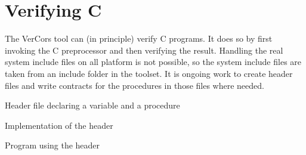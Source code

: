 \chapter{Verifying C}


The VerCors tool can (in principle) verify C programs.
It does so by first invoking the C preprocessor and
then verifying the result. Handling the real system
include files on all platform is not possible, so
the system include files are taken from an include
folder in the toolset. It is ongoing work to create
header files and write contracts for the procedures
in those files where needed.


\begin{listing}

\caption{Header file declaring a variable and a procedure}
\label{c header}
\end{listing}

\begin{listing}

\caption{Implementation of the header}
\label{c implementation}
\end{listing}

\begin{listing}

\caption{Program using the header}
\label{c use case}
\end{listing}



